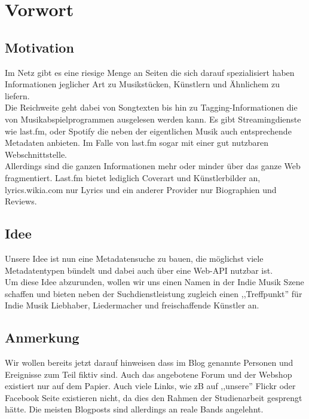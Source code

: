 \chapter{Vorwort}

\section{Motivation}

Im Netz gibt es eine riesige Menge an Seiten die sich darauf spezialisiert
haben Informationen jeglicher Art zu Musikstücken, Künstlern und Ähnlichem zu
liefern.
\\
Die Reichweite geht dabei von Songtexten bis hin zu Tagging-Informationen die von
Musikabspielprogrammen ausgelesen werden kann. Es gibt Streamingdienste wie last.fm,
oder Spotify die neben der eigentlichen Musik auch entsprechende Metadaten anbieten. 
Im Falle von last.fm sogar mit einer gut nutzbaren Webschnittstelle.
\\
Allerdings sind die ganzen Informationen mehr oder minder über das ganze Web
fragmentiert. Last.fm bietet lediglich Coverart und Künstlerbilder an, 
lyrics.wikia.com nur Lyrics und ein anderer Provider nur Biographien und
Reviews.
\\
\section{Idee}
Unsere Idee ist nun eine Metadatensuche zu bauen, die möglichst viele
Metadatentypen bündelt und dabei auch über eine Web-API nutzbar ist.
\\
Um diese Idee abzurunden, wollen wir uns einen Namen in der Indie Musik Szene
schaffen und bieten neben der Suchdienstleistung zugleich einen ,,Treffpunkt'' für Indie
Musik Liebhaber, Liedermacher und freischaffende Künstler an.

\section{Anmerkung}
Wir wollen bereits jetzt darauf hinweisen dass im Blog genannte Personen und
Ereignisse zum Teil fiktiv sind. Auch das angebotene Forum und der Webshop
existiert nur auf dem Papier. Auch viele Links, wie zB auf ,,unsere'' Flickr
oder Facebook Seite existieren nicht, da dies den Rahmen der Studienarbeit
gesprengt hätte. Die meisten Blogposts sind allerdings an reale
Bands angelehnt.
